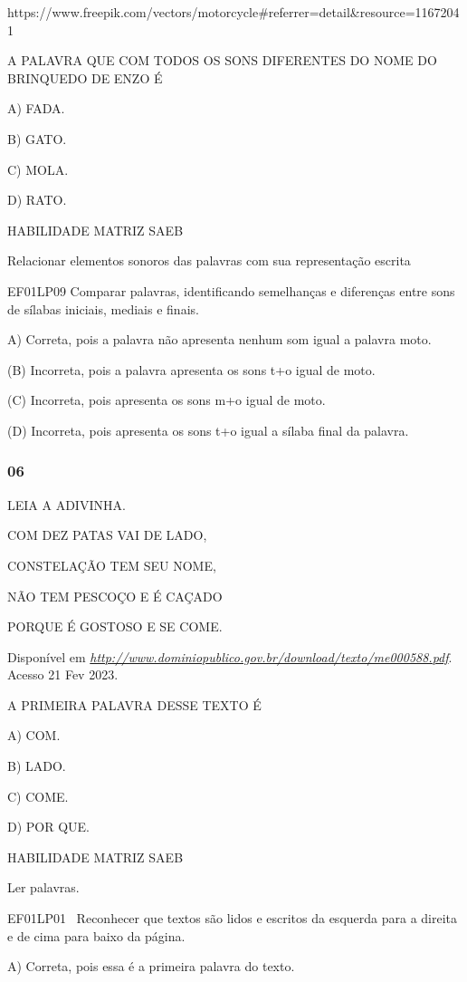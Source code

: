 https://www.freepik.com/vectors/motorcycle\#referrer=detail\&resource=11672041

A PALAVRA QUE COM TODOS OS SONS DIFERENTES DO NOME DO BRINQUEDO DE ENZO
É

A) FADA.

B) GATO.

C) MOLA.

D) RATO.

HABILIDADE MATRIZ SAEB

Relacionar elementos sonoros das palavras com sua representação escrita

EF01LP09 Comparar palavras, identificando semelhanças e diferenças entre
sons de sílabas iniciais, mediais e finais.

A) Correta, pois a palavra não apresenta nenhum som igual a palavra
moto.

(B) Incorreta, pois a palavra apresenta os sons t+o igual de moto.

(C) Incorreta, pois apresenta os sons m+o igual de moto.

(D) Incorreta, pois apresenta os sons t+o igual a sílaba final da
palavra.

\subsubsection{06}\label{section-78}

LEIA A ADIVINHA.

COM DEZ PATAS VAI DE LADO,

CONSTELAÇÃO TEM SEU NOME,

NÃO TEM PESCOÇO E É CAÇADO

PORQUE É GOSTOSO E SE COME.

Disponível em
\href{http://www.dominiopublico.gov.br/download/texto/me000588.pdf}{\emph{http://www.dominiopublico.gov.br/download/texto/me000588.pdf}}.
Acesso 21 Fev 2023.

A PRIMEIRA PALAVRA DESSE TEXTO É

A) COM.

B) LADO.

C) COME.

D) POR QUE.

HABILIDADE MATRIZ SAEB

Ler palavras.

EF01LP01 ~Reconhecer que textos são lidos e escritos da esquerda para a
direita e de cima para baixo da página.

A) Correta, pois essa é a primeira palavra do texto.


